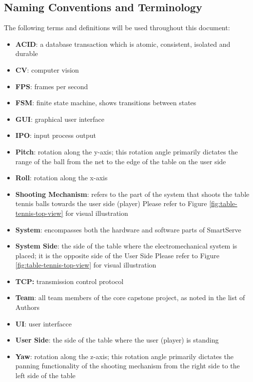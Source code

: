 \documentclass[11pt]{article}
\begin{document}
\subsection{Naming Conventions and Terminology}
\label{sec:definitions}
The following terms and definitions will be used throughout this document:
\begin{itemize}
\item \textbf{ACID}: a database transaction which is atomic, consistent, isolated and durable
\item \textbf{CV}: computer vision
\item \textbf{FPS}: frames per second
\item \textbf{FSM}: finite state machine, shows transitions between states
\item \textbf{GUI}: graphical user interface
\item \textbf{IPO}: input process output
\item \textbf{Pitch}: rotation along the y-axis; this rotation angle primarily dictates the range of the ball from the net to the edge of the table on the user side
\item \textbf{Roll}: rotation along the x-axis
\item \textbf{Shooting Mechanism}: refers to the part of the system that shoots the table tennis balls towards the user side (player) Please refer to Figure \ref{fig:table-tennis-top-view} for visual illustration
\item \textbf{System}: encompasses both the hardware and software parts of SmartServe
\item \textbf{System Side}: the side of the table where the electromechanical system is placed; it is the opposite side of the User Side Please refer to Figure \ref{fig:table-tennis-top-view} for visual illustration
\item \textbf{TCP:} transmission control protocol
\item \textbf{Team}: all team members of the core capstone project, as noted in the list of Authors
\item \textbf{UI}: user interfacce
\item \textbf{User Side}: the side of the table where the user (player) is standing
\item \textbf{Yaw}: rotation along the z-axis; this rotation angle primarily dictates the panning functionality of the shooting mechanism from the right side to the left side of the table
\end{itemize}
\end{document}

